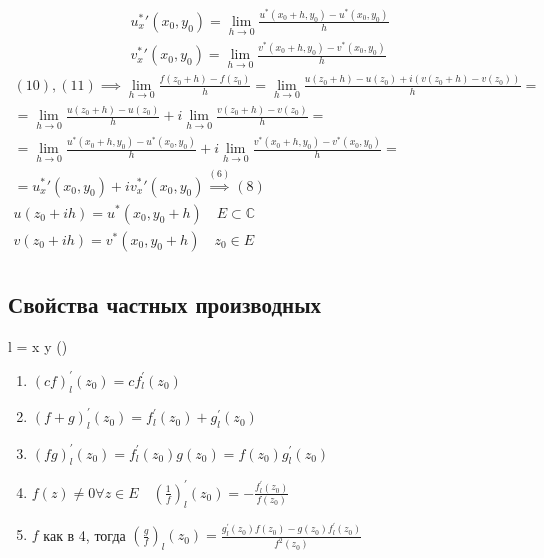 \documentclass[main]{subfiles}
\begin{document}
\begin{longProof}
    \begin{gather*}
    u^*_x \prime (x_0,y_0) = \underset{h \to 0}{\lim} \frac{u^*(x_0+h,y_0)-u^*(x_0,y_0)}{h} \tag{10} \\
    v^*_x \prime (x_0,y_0) = \underset{h \to 0}{\lim} \frac{v^*(x_0+h,y_0)-v^*(x_0,y_0)}{h} \tag{11} 
\end{gather*}
\begin{multline*}
    (10),(11) \implies \underset{h \to 0}{\lim} \frac{f(z_0+h)-f(z_0)}{h} = \underset{h \to 0}{\lim} \frac{u(z_0+h)-u(z_0) + i(v(z_0+h)-v(z_0))}{h} = \\
     = \underset{h \to 0}{\lim} \frac{u(z_0+h)-u(z_0)}{h} + i \underset{h \to 0}{\lim} \frac{v(z_0+h)-v(z_0)}{h} = \\
     = \underset{h \to 0}{\lim} \frac{u^*(x_0+h,y_0)-u^*(x_0,y_0)}{h} + i \underset{h \to 0}{\lim} \frac{v^*(x_0+h,y_0)-v^*(x_0,y_0)}{h} = \\
     = u^*_x\prime(x_0,y_0) + i v^*_x\prime(x_0,y_0) \stackrel{(6)}{\implies} (8) \\
     u(z_0 + ih) = u^*(x_0,y_0+h) \quad E \subset \mathbb{C} \\
     v(z_0 + ih) = v^*(x_0,y_0+h) \quad z_0 \in E \\
\end{multline*}
\end{longProof}

\subsection{Свойства частных производных}
l = x  y ()
\begin{enumerate}
    \item $(cf)^\prime_l(z_0) = cf^\prime_l(z_0)$
    \item $(f+g)^\prime_l(z_0) = f^\prime_l(z_0) + g^\prime_l(z_0)$
    \item $(fg)^\prime_l(z_0) = f^\prime_l(z_0)g(z_0) = f(z_0)g^\prime_l(z_0)$
    \item $f(z) \ne 0 \forall z \in E \quad \left( \frac{1}{f} \right)^{\prime}_l (z_0) = - \frac{f^\prime_l(z_0)}{f(z_0)}$
    \item $f$ как в 4, тогда $\left(\frac{g}{f}\right)_l(z_0) = \frac{g^\prime_l(z_0)f(z_0)-g(z_0)f^\prime_l(z_0)}{f^2(z_0)}$
\end{enumerate}
\end{document}
